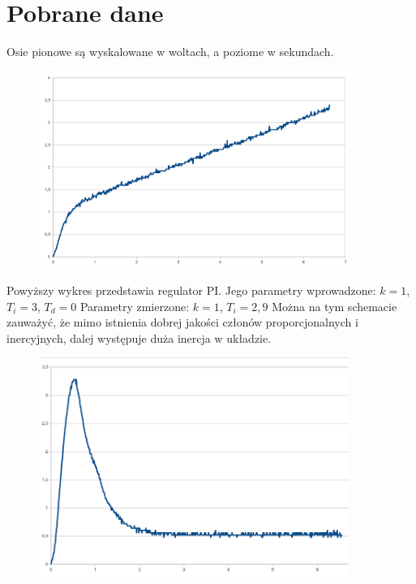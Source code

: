 \documentclass[a4paper, 12pt]{article}
\begin{document}
	\section{Pobrane dane}
		Osie pionowe są wyskalowane w woltach, a poziome w sekundach.
		\begin{figure}[H]
			\centering
			\includegraphics[width=0.9\textwidth]{./grafika/PI.png}
		\end{figure}
		Powyższy wykres przedstawia regulator PI.\newline 
		Jego parametry wprowadzone: $k = 1$, $T_i = 3$, $T_d = 0$
		\newline
		Parametry zmierzone:
		$k = 1$, $T_i = 2,9$
		\newline
		\newline
		Można na tym schemacie zauważyć, że mimo istnienia dobrej jakości członów proporcjonalnych i inercyjnych, dalej występuje duża inercja w układzie.
		\begin{figure}[H]
			\centering
			\includegraphics[width=0.9\textwidth]{./grafika/PD.png}
		\end{figure}
\end{document}

